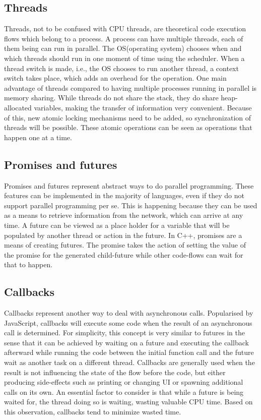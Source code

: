 \subsection{Threads}
Threads, not to be confused with CPU threads, are theoretical code execution flows which belong to a process. A process can have multiple threads, each of them being can run in parallel. The OS(operating system) chooses when and which threads should run in one moment of time using the scheduler. When a thread switch is made, i.e., the OS chooses to run another thread, a context switch takes place, which adds an overhead for the operation. One main advantage of threads compared to having multiple processes running in parallel is memory sharing. While threads do not share the stack, they do share heap-allocated variables, making the transfer of information very convenient. Because of this, new atomic locking mechanisms need to be added, so synchronization of threads will be possible. These atomic operations can be seen as operations that happen one at a time.

\subsection{Promises and futures}
Promises and futures represent abstract ways to do parallel programming. These features can be implemented in the majority of languages, even if they do not support parallel programming per se. This is happening because they can be used as a means to retrieve information from the network, which can arrive at any time. A future can be viewed as a place holder for a variable that will be populated by another thread or action in the future. In C++, promises are a means of creating futures. The promise takes the action of setting the value of the promise for the generated child-future while other code-flows can wait for that to happen.

\subsection{Callbacks}
Callbacks represent another way to deal with asynchronous calls. Popularised by JavaScript, callbacks will execute some code when the result of an asynchronous call is determined. For simplicity, this concept is very similar to futures in the sense that it can be achieved by waiting on a future and executing the callback afterward while running the code between the initial function call and the future wait as another task on a different thread. Callbacks are generally used when the result is not influencing the state of the flow before the code, but either producing side-effects such as printing or changing UI or spawning additional calls on its own. An essential factor to consider is that while a future is being waited for, the thread doing so is waiting, wasting valuable CPU time. Based on this observation, callbacks tend to minimize wasted time.

